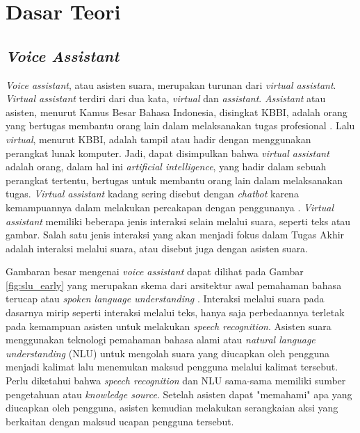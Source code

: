 \chapter{Dasar Teori}

\section{\textit{Voice Assistant}}

\textit{Voice assistant}, atau asisten suara, merupakan turunan dari \textit{virtual assistant}. \textit{Virtual assistant} terdiri dari dua kata, \textit{virtual} dan \textit{assistant}. \textit{Assistant} atau asisten, menurut Kamus Besar Bahasa Indonesia, disingkat KBBI, adalah orang yang bertugas membantu orang lain dalam melaksanakan tugas profesional \parencite{kbbi}. Lalu \textit{virtual}, menurut KBBI, adalah tampil atau hadir dengan menggunakan perangkat lunak komputer. Jadi, dapat disimpulkan bahwa \textit{virtual assistant} adalah orang, dalam hal ini \textit{artificial intelligence}, yang hadir dalam sebuah perangkat tertentu, bertugas untuk membantu orang lain dalam melaksanakan tugas. \textit{Virtual assistant} kadang sering disebut dengan \textit{chatbot} karena kemampuannya dalam melakukan percakapan dengan penggunanya \parencite{tech2005imbot}. \textit{Virtual assistant} memiliki beberapa jenis interaksi selain melalui suara, seperti teks atau gambar. Salah satu jenis interaksi yang akan menjadi fokus dalam Tugas Akhir adalah interaksi melalui suara, atau disebut juga dengan asisten suara.

Gambaran besar mengenai \textit{voice assistant} dapat dilihat pada Gambar \ref{fig:slu_early} yang merupakan skema dari arsitektur awal pemahaman bahasa terucap atau \textit{spoken language understanding} \parencite{tur2011spoken}. Interaksi melalui suara pada dasarnya mirip seperti interaksi melalui teks, hanya saja perbedaannya terletak pada kemampuan asisten untuk melakukan \textit{speech recognition}. Asisten suara menggunakan teknologi pemahaman bahasa alami atau \textit{natural language understanding} (NLU) untuk mengolah suara yang diucapkan oleh pengguna menjadi kalimat lalu menemukan maksud pengguna melalui kalimat tersebut. Perlu diketahui bahwa \textit{speech recognition} dan NLU sama-sama memiliki sumber pengetahuan atau \textit{knowledge source}. Setelah asisten dapat "memahami" apa yang diucapkan oleh pengguna, asisten kemudian melakukan serangkaian aksi yang berkaitan dengan maksud ucapan pengguna tersebut.


